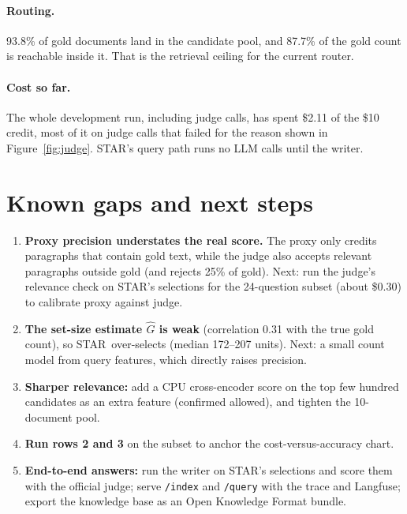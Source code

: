 \documentclass[10pt,a4paper]{article}
\newcommand{\STAR}{\textsc{STAR}}
\begin{document}
\paragraph{Routing.} 93.8\% of gold documents land in the candidate pool, and 87.7\% of the gold count is reachable inside it. That is the retrieval ceiling for the current router.

\paragraph{Cost so far.} The whole development run, including judge calls, has spent \$2.11 of the \$10 credit, most of it on judge calls that failed for the reason shown in Figure~\ref{fig:judge}.
\STAR's query path runs no LLM calls until the writer.

\section{Known gaps and next steps}
\label{sec:next}

\begin{enumerate}
\item \textbf{Proxy precision understates the real score.} The proxy only credits paragraphs that contain gold text, while the judge also accepts relevant paragraphs outside gold (and rejects 25\% of gold). Next: run the judge's relevance check on \STAR's selections for the 24-question subset (about \$0.30) to calibrate proxy against judge.
\item \textbf{The set-size estimate $\hat G$ is weak} (correlation 0.31 with the true gold count), so \STAR\ over-selects (median 172--207 units). Next: a small count model from query features, which directly raises precision.
\item \textbf{Sharper relevance:} add a CPU cross-encoder score on the top few hundred candidates as an extra feature (confirmed allowed), and tighten the 10-document pool.
\item \textbf{Run rows 2 and 3} on the subset to anchor the cost-versus-accuracy chart.
\item \textbf{End-to-end answers:} run the writer on \STAR's selections and score them with the official judge; serve \texttt{/index} and \texttt{/query} with the trace and Langfuse; export the knowledge base as an Open Knowledge Format bundle.
\end{enumerate}
\end{document}
